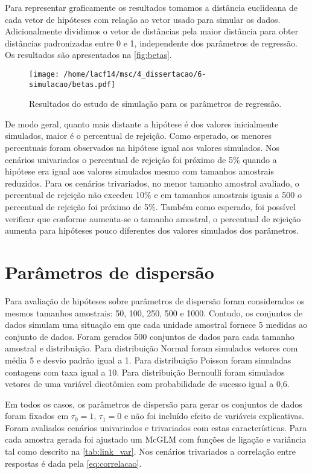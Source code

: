 Para representar graficamente os resultados tomamos a distância euclideana de cada vetor de hipóteses com relação ao vetor usado para simular os dados. Adicionalmente dividimos o vetor de distâncias pela maior distância para obter distâncias padronizadas entre 0 e 1, independente dos parâmetros de regressão. Os resultados são apresentados na \autoref{fig:betas}.

\begin{figure}[H]
\centering
\texttt{[image: /home/lacf14/msc/4\_dissertacao/6-simulacao/betas.pdf]}
\caption{Resultados do estudo de simulação para os parâmetros de regressão.}
\label{fig:betas}
\end{figure}

De modo geral, quanto mais distante a hipótese é dos valores inicialmente simulados, maior é o percentual de rejeição. Como esperado, os menores percentuais foram observados na hipótese igual aos valores simulados. Nos cenários univariados o percentual de rejeição foi próximo de 5\% quando a hipótese era igual aos valores simulados mesmo com tamanhos amostrais reduzidos. Para os cenários trivariados, no menor tamanho amostral avaliado, o percentual de rejeição não excedeu 10\% e em tamanhos amostrais iguais a 500 o percentual de rejeição foi próximo de 5\%. Também como esperado, foi possível verificar que conforme aumenta-se o tamanho amostral, o percentual de rejeição aumenta para hipóteses pouco diferentes dos valores simulados dos parâmetros.

\section{Parâmetros de dispersão}

Para avaliação de hipóteses sobre parâmetros de dispersão foram considerados os mesmos tamanhos amostrais: 50, 100, 250, 500 e 1000. Contudo, os conjuntos de dados simulam uma situação em que cada unidade amostral fornece 5 medidas ao conjunto de dados. Foram gerados 500 conjuntos de dados para cada tamanho amostral e distribuição. Para distribuição Normal foram simulados vetores com média 5 e desvio padrão igual a 1. Para distribuição Poisson foram simuladas contagens com taxa igual a 10. Para distribuição Bernoulli foram simulados vetores de uma variável dicotômica com probabilidade de sucesso igual a 0,6.

Em todos os casos, os parâmetros de dispersão para gerar os conjuntos de dados foram fixados em $\tau_0 = 1$, $\tau_1 = 0$ e não foi incluído efeito de variáveis explicativas. Foram avaliados cenários univariados e trivariados com estas características. Para cada amostra gerada foi ajustado um McGLM com funções de ligação e variância tal como descrito na \autoref{tab:link_var}. Nos cenários trivariados a correlação entre respostas é dada pela \autoref{eq:correlacao}.

